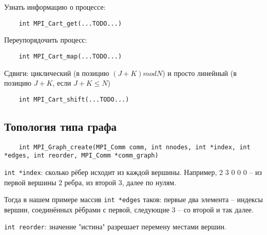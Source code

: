 \documentclass[main.tex]{subfiles}
\begin{document}
Узнать информацию о процессе:

\begin{verbatim}
	int MPI_Cart_get(...TODO...)
\end{verbatim}

Переупорядочить процесс:

\begin{verbatim}
	int MPI_Cart_map(...TODO...)
\end{verbatim}

Сдвиги: циклический (в позицию $ (J + K) mod N $) и просто линейный (в позицию  $ J + K $, если $ J + K \le N $)

\begin{verbatim}
	int MPI_Cart_shift(...TODO...)
\end{verbatim}

\subsection{ Топология типа графа }

\begin{verbatim}
	int MPI_Graph_create(MPI_Comm comm, int nnodes, int *index, int *edges, int reorder, MPI_Comm *comm_graph)
\end{verbatim}

\texttt{int *index}: сколько рёбер исходит из каждой вершины.
Например, 2 3 0 0 0 -- из первой вершины 2 ребра, из второй 3, далее по нулям.

Тогда в нашем примере массив \texttt{int *edges} таков: первые два элемента -- индексы вершин, соединённых рёбрами с первой, следующие 3 -- со второй и так далее.

\texttt{int reorder}: значение "истина" разрешает перемену местами вершин.
\end{document}
